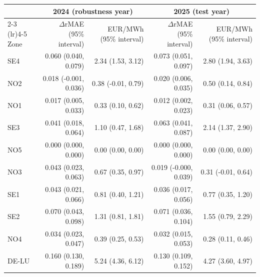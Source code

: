 \begin{tabular}{lrrrr}
\toprule
 & \multicolumn{2}{c}{2024 (robustness year)} & \multicolumn{2}{c}{2025 (test year)} \\
\cmidrule(lr){2-3} \cmidrule(lr){4-5}
Zone & $\Delta$rMAE (95\% interval) & EUR/MWh (95\% interval) & $\Delta$rMAE (95\% interval) & EUR/MWh (95\% interval) \\
\midrule
SE4 & 0.060 (0.040, 0.079) & 2.34 (1.53, 3.12) & 0.073 (0.051, 0.097) & 2.80 (1.94, 3.63) \\
NO2 & 0.018 (-0.001, 0.036) & 0.38 (-0.01, 0.79) & 0.020 (0.006, 0.035) & 0.50 (0.14, 0.84) \\
NO1 & 0.017 (0.005, 0.033) & 0.33 (0.10, 0.62) & 0.012 (0.002, 0.023) & 0.31 (0.06, 0.57) \\
SE3 & 0.041 (0.018, 0.064) & 1.10 (0.47, 1.68) & 0.063 (0.041, 0.087) & 2.14 (1.37, 2.90) \\
NO5 & 0.000 (0.000, 0.000) & 0.00 (0.00, 0.00) & 0.000 (0.000, 0.000) & 0.00 (0.00, 0.00) \\
NO3 & 0.043 (0.023, 0.063) & 0.67 (0.35, 0.97) & 0.019 (-0.000, 0.039) & 0.31 (-0.01, 0.64) \\
SE1 & 0.043 (0.021, 0.066) & 0.81 (0.40, 1.21) & 0.036 (0.017, 0.056) & 0.77 (0.35, 1.20) \\
SE2 & 0.070 (0.043, 0.098) & 1.31 (0.81, 1.81) & 0.071 (0.036, 0.104) & 1.55 (0.79, 2.29) \\
NO4 & 0.034 (0.023, 0.047) & 0.39 (0.25, 0.53) & 0.032 (0.015, 0.053) & 0.28 (0.11, 0.46) \\
DE-LU & 0.160 (0.130, 0.189) & 5.24 (4.36, 6.12) & 0.130 (0.109, 0.152) & 4.27 (3.60, 4.97) \\
\bottomrule
\end{tabular}
